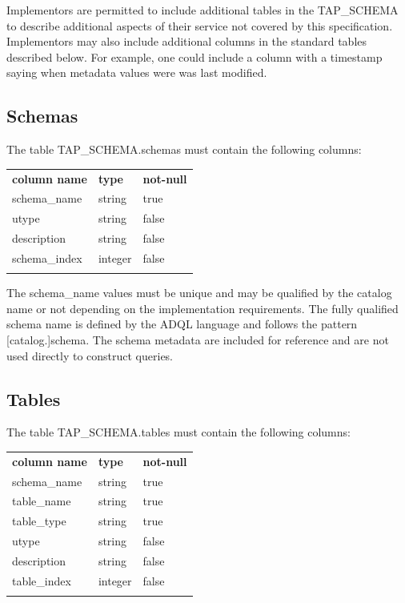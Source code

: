 \documentclass[11pt,letter]{ivoa}
\newcommand{\tapschema}{TAP\_SCHEMA}
\newcommand{\tapschema}{{%
  \relsize{-0.5}TAP\discretionary{-}{}{\kern-2pt\_}SCHEMA}}
\begin{document}
Implementors are permitted to include additional tables in the 
\tapschema{} to describe additional aspects of their service not 
covered by this specification. Implementors may also include additional columns 
in the standard tables described below. For example, one could include a column 
with a timestamp saying when metadata values were was last modified.

\subsection{Schemas}
\label{sec:tap-schema-schemas}

The table \tapschema.schemas must contain the following columns:

\begin{inlinetable}
\begin{tabular}{l l l}
\sptablerule
\textbf{column name} & \textbf{type} & \textbf{not-null} \\
\sptablerule
schema\_name & string & true \\
utype & string & false \\
description & string & false \\
schema\_index & integer & false \\
\sptablerule
\end{tabular}
\end{inlinetable}

The schema\_name values must be unique and may be qualified by the 
catalog name or not depending on the implementation requirements. The fully 
qualified schema name is defined by the ADQL language and  follows the pattern 
[catalog.]schema. The schema metadata are included for reference and are not 
used directly to construct queries.

\subsection{Tables}
\label{sec:tap-schema-tables}
The table \tapschema.tables must contain the following columns:

\begin{inlinetable}
\begin{tabular}{l l l}
\sptablerule
\textbf{column name} & \textbf{type} & \textbf{not-null} \\
\sptablerule
schema\_name & string & true \\
table\_name & string & true \\
table\_type & string & true \\
utype & string & false \\
description & string & false \\
table\_index & integer & false \\
\sptablerule
\end{tabular}
\end{inlinetable}
\end{document}
